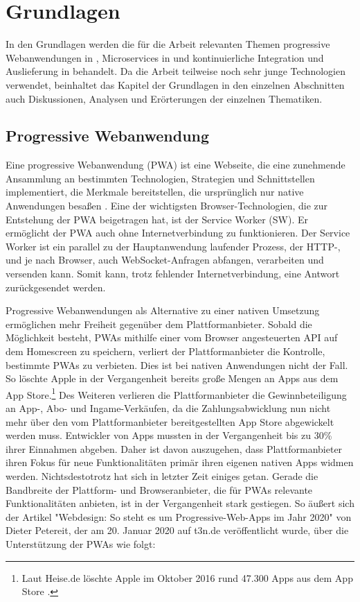 \chapter{Grundlagen}
\label{chap:grundlagen}
In den Grundlagen werden die für die Arbeit relevanten Themen progressive Webanwendungen in ,
Microservices in  und kontinuierliche Integration und Auslieferung
in  behandelt. Da die Arbeit teilweise noch
sehr junge Technologien verwendet, beinhaltet das Kapitel der Grundlagen in den einzelnen Abschnitten
auch Diskussionen, Analysen und Erörterungen der einzelnen Thematiken.

\section{Progressive Webanwendung}
\label{sec:progressivewebanwendung}
Eine progressive Webanwendung (PWA) ist eine Webseite, die eine zunehmende Ansammlung
an bestimmten Technologien, Strategien und Schnittstellen implementiert,
die Merkmale bereitstellen, die ursprünglich nur native Anwendungen besaßen \cite{WikiPWA}.
Eine der wichtigsten Browser-Technologien, die zur Entstehung der PWA beigetragen hat,
ist der Service Worker (SW). Er ermöglicht der PWA auch ohne Internetverbindung zu funktionieren. Der 
Service Worker ist ein parallel zu der Hauptanwendung laufender Prozess, der HTTP-, und je nach Browser,
auch WebSocket-Anfragen abfangen, verarbeiten und versenden kann. Somit kann, trotz fehlender Internetverbindung,
eine Antwort zurückgesendet werden.\cite{W3ServiceWorker}

Progressive Webanwendungen als Alternative zu einer nativen Umsetzung ermöglichen mehr Freiheit gegenüber dem
Plattformanbieter. Sobald die Möglichkeit besteht, PWAs mithilfe einer vom Browser angesteuerten API
auf dem Homescreen zu speichern, verliert der Plattformanbieter die Kontrolle,
bestimmte PWAs zu verbieten. Dies ist bei nativen Anwendungen nicht der Fall. So löschte Apple in der Vergangenheit
bereits große Mengen an Apps aus dem App Store.\footnote{Laut Heise.de löschte Apple im Oktober
2016 rund 47.300 Apps aus dem App Store \cite{HeiseAppleLoeschtApps}.}
Des Weiteren verlieren die Plattformanbieter die Gewinnbeteiligung an App-, Abo- und Ingame-Verkäufen,
da die Zahlungsabwicklung nun nicht mehr über den vom Plattformanbieter bereitgestellten App Store
abgewickelt werden muss. Entwickler von Apps mussten in der Vergangenheit bis zu 30\% 
ihrer Einnahmen abgeben.\cite{WinFutureEigenerAppStore} Daher ist davon auszugehen,
dass Plattformanbieter ihren Fokus für neue Funktionalitäten primär ihren eigenen
nativen Apps widmen werden. Nichtsdestotrotz hat sich in letzter Zeit einiges getan.
Gerade die Bandbreite der Plattform- und Browseranbieter, die für PWAs relevante
Funktionalitäten anbieten, ist in der Vergangenheit stark gestiegen. So äußert sich der Artikel
"Webdesign: So steht es um Progressive-Web-Apps im Jahr 2020" von Dieter Petereit,
der am 20. Januar 2020 auf t3n.de veröffentlicht wurde, über die Unterstützung der PWAs wie folgt:

